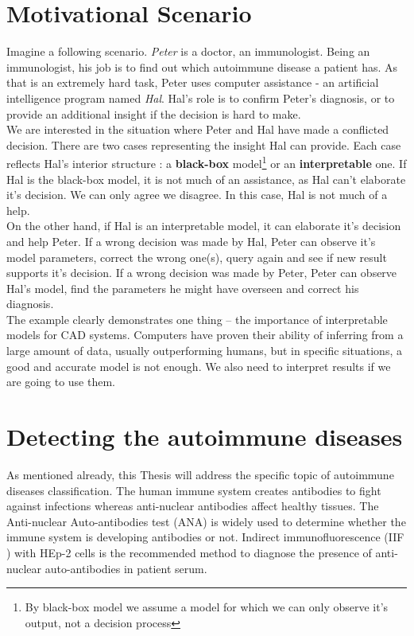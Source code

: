 
\section{Motivational Scenario}

Imagine a following scenario. \textit{Peter} is a doctor, an immunologist. Being an immunologist, his job is to find out which autoimmune disease a patient has. As that is an extremely hard task, Peter uses  computer assistance - an artificial intelligence program named \textit{Hal}. Hal's role is to confirm Peter's diagnosis, or to provide an additional insight if the decision is hard to make. \\

We are interested in the situation where Peter and Hal have made a conflicted decision. There are two cases representing the insight Hal can provide. Each case reflects Hal's interior structure : a \textbf{black-box} model\footnote{By black-box model we assume a model for which we can only observe it's output, not a decision process} or an \textbf{ interpretable} one. If Hal is the black-box model, it is not much of an assistance, as Hal can't elaborate it's decision. We can only agree we disagree. In this case, Hal is not much of a help. \\

On the other hand, if Hal is an interpretable model, it can elaborate it's decision and help Peter. If a wrong decision was made by Hal, Peter can observe it's model parameters, correct the wrong one(s), query again and see if new result supports it's decision. If a wrong decision was made by Peter, Peter can observe Hal's model, find the parameters he might have overseen and correct his diagnosis. \\

The example clearly demonstrates one  thing -- the importance of interpretable models for CAD systems. Computers have proven their ability of inferring from a large amount of data, usually outperforming humans, but in specific situations, a good and accurate model is not enough. We also need to interpret results if we are going to use them.

\section{Detecting the autoimmune diseases}

As mentioned already, this Thesis will address the specific topic of autoimmune diseases classification. The human immune system creates antibodies to fight against infections whereas anti-nuclear antibodies affect healthy tissues. The Anti-nuclear Auto-antibodies test (ANA) is widely used to determine whether the immune system is developing antibodies or not. Indirect immunofluorescence (IIF ) with HEp-2 cells is the recommended method to diagnose the presence of anti-nuclear auto-antibodies in patient serum. \\

